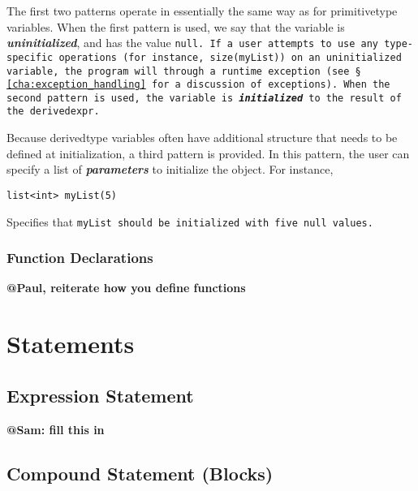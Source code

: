 \documentclass{book}
\begin{document}
The first two patterns operate in essentially the same way as for primitive­type
variables. When the first pattern is used, we say that the variable is
\textbf{\emph{uninitialized}}, and has the value \tt null\rm. If a user attempts to
use any type­specific operations (for instance, \tt size(myList)) \rm on an
uninitialized variable, the program will through a run­time exception (see \S
\ref{cha:exception_handling} for a discussion of exceptions). When the second
pattern is used, the variable is \textbf{\emph{initialized}} to the result of the
\tt derived­expr\rm.

Because derived­type variables often have additional structure that needs to be
defined at initialization, a third pattern is provided. In this pattern, the user
can specify a list of \textbf{\emph{parameters}} to initialize the object. For
instance,

\begin{verbatim}
list<int> myList(5)
\end{verbatim}

Specifies that \tt myList \rm should be initialized with five \tt null \rm values.


\subsection{Function Declarations} %
\label{sub:function_declarations}

\textbf{@Paul, reiterate how you define functions}




\chapter{Statements} %
\label{cha:statements}

\section{Expression Statement} %
\label{sec:expression_statement}

\textbf{@Sam: fill this in}


\section{Compound Statement (Blocks)} %
\label{sec:compound_statement}
\end{document}
